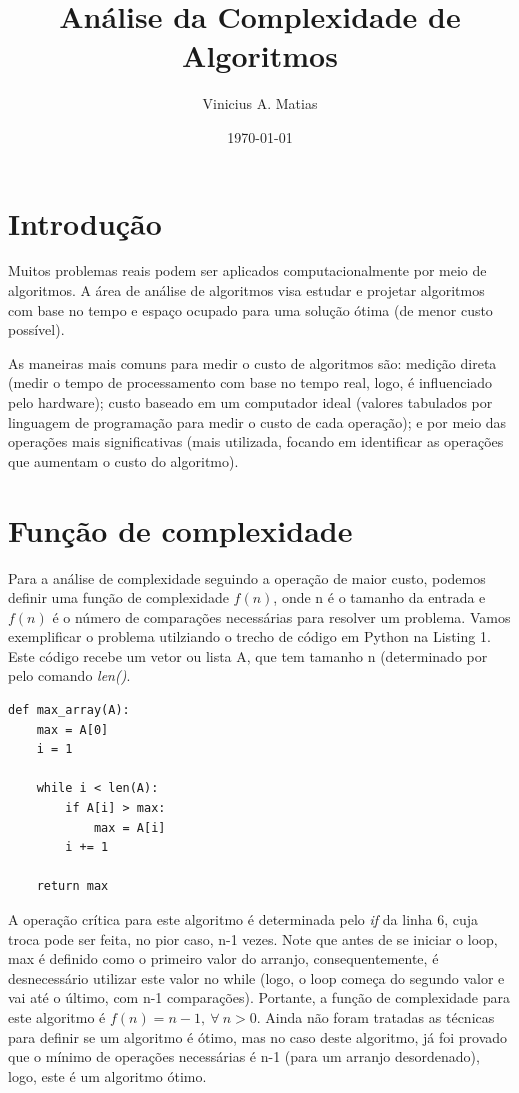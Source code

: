 \documentclass[ a4paper, twocolumn]{article}
\title{Análise da Complexidade de Algoritmos}
\author{Vinicius A. Matias}
\date{\today}
\theoremstyle{definition}
\begin{document}
\maketitle

\section{Introdução}
Muitos problemas reais podem ser aplicados computacionalmente por meio de algoritmos. A área de análise de algoritmos visa estudar e projetar algoritmos com base no tempo e espaço ocupado para uma solução ótima (de menor custo possível). 

As maneiras mais comuns para medir o custo de algoritmos são: medição direta (medir o tempo de processamento com base no tempo real, logo, é influenciado pelo hardware); custo baseado em um computador ideal (valores tabulados  por linguagem de programação para medir o custo de cada operação); e por meio das operações mais significativas (mais utilizada, focando em identificar as operações que aumentam o custo do algoritmo).

\section{Função de complexidade}

Para a análise de complexidade seguindo a operação de maior custo, podemos definir uma função de complexidade $f(n)$, onde n é o tamanho da entrada e $f(n)$ é o número de comparações necessárias para resolver um problema. Vamos exemplificar o problema utilziando o trecho de código em Python na Listing 1. Este código recebe um vetor ou lista A, que tem tamanho n (determinado por pelo comando \textit{len()}.

\begin{lstlisting}[label=max_array,caption= Maior valor de um arranjo]
def max_array(A):
    max = A[0]
    i = 1
    
    while i < len(A):
        if A[i] > max:
            max = A[i]  
        i += 1
    
    return max
\end{lstlisting}

A operação crítica para este algoritmo é determinada pelo \textit{if} da linha 6, cuja troca pode ser feita, no pior caso, n-1 vezes. Note que antes de se iniciar o loop, max é definido como o primeiro valor do arranjo, consequentemente, é desnecessário utilizar este valor no while (logo, o loop começa do segundo valor e vai até o último, com n-1 comparações). Portante, a função de complexidade para este algoritmo é $f(n) = n - 1, \ \forall \ n>0$. Ainda não foram tratadas as técnicas para definir se um algoritmo é ótimo, mas no caso deste algoritmo, já foi provado que o mínimo de operações necessárias é n-1 (para um arranjo desordenado), logo, este é um algoritmo ótimo.
\end{document}
